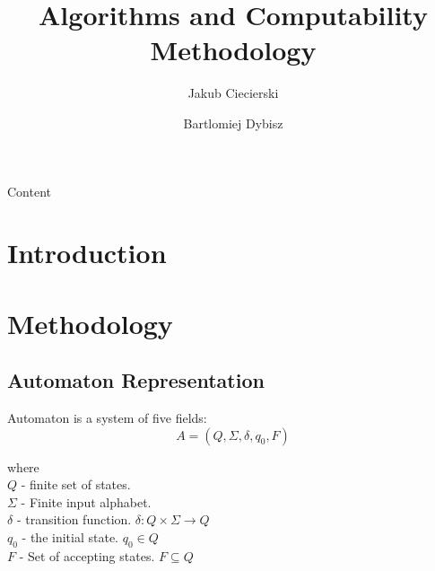 \documentclass[runningheads,a4paper]{llncs}
\begin{document}
\vspace{-100pt}
\mainmatter

\title{Algorithms and Computability \\Methodology}


\author{Jakub Ciecierski\and Bartlomiej Dybisz}



\maketitle

\abstract{} Content \\


\section{Introduction}

\section{Methodology}

\subsection{Automaton Representation}

Automaton is a system of five fields:
\begin{equation}
	A = (Q, \Sigma, \delta, q_0, F)
\end{equation}

where \\
$Q$ - finite set of states. \\
$\Sigma$ - Finite input alphabet. \\
$\delta$ - transition function. $\delta: Q \times \Sigma \rightarrow Q$ \\
$q_0$ - the initial state. $q_0 \in Q$ \\
$F$ - Set of accepting states. $F \subseteq Q$ \\
\end{document}
